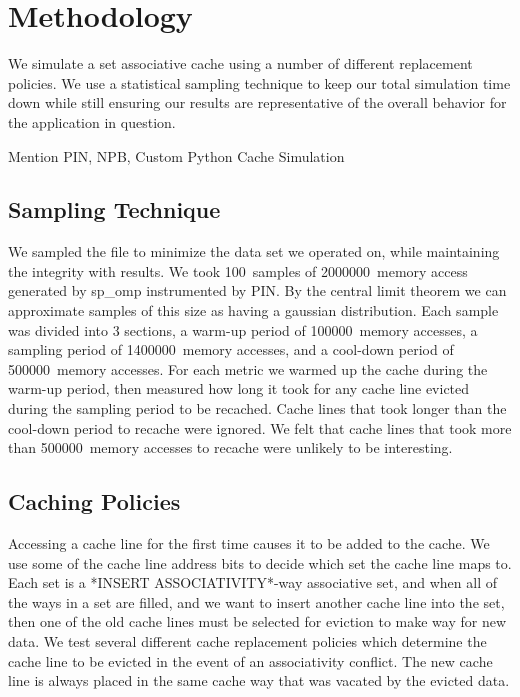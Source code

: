 \newcommand{\SAMPN}{100}
\newcommand{\SAMPK}{2000000}
\newcommand{\SAMP}{1400000}
\newcommand{\WARM}{100000}
\newcommand{\COOL}{500000}

\section{Methodology}
We simulate a set associative cache using a number of different
replacement policies.
We use a statistical sampling technique to keep our total simulation
time down while still ensuring our results are representative of the
overall behavior for the application in question.

Mention PIN, NPB, Custom Python Cache Simulation

\subsection{Sampling Technique}
We sampled the file to minimize the data set we operated on, while maintaining the integrity with results.
	We took \SAMPN~samples of \SAMPK~memory access generated by sp\_omp instrumented by PIN.
	By the central limit theorem we can approximate samples of this size as having a gaussian distribution.
	Each sample was divided into 3 sections, a warm-up period of \WARM~memory accesses,
		a sampling period of \SAMP~memory accesses, and a cool-down period of \COOL~memory accesses.
	For each metric we warmed up the cache during the warm-up period,
		then measured how long it took for any cache line evicted during the sampling period to be recached.
	Cache lines that took longer than the cool-down period to recache were ignored.
	We felt that cache lines that took more than \COOL~memory accesses to recache were unlikely to be interesting.

\subsection{Caching Policies}
\label{sec:policies}

Accessing a cache line for the first time causes it to be added to the cache.  We use some of the cache line address bits to decide which set the cache line maps to.  Each set is a *INSERT ASSOCIATIVITY*-way associative set, and when all of the ways in a set are filled, and we want to insert another cache line into the set, then one of the old cache lines must be selected for eviction to make way for new data. We test several different cache replacement policies which determine the cache line to be evicted in the event of an associativity conflict.  The new cache line is always placed in the same cache way that was vacated by the evicted data.


